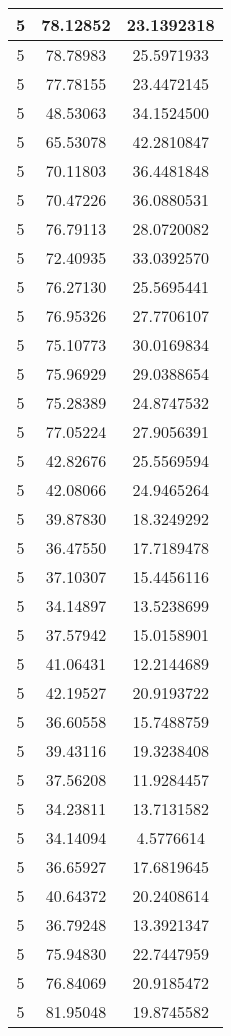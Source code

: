 \documentclass[
]{book}
\begin{document}
\begin{tabular}{c|c|c}
\hline
5 & 78.12852 & 23.1392318\\
\hline
5 & 78.78983 & 25.5971933\\
\hline
5 & 77.78155 & 23.4472145\\
\hline
5 & 48.53063 & 34.1524500\\
\hline
5 & 65.53078 & 42.2810847\\
\hline
5 & 70.11803 & 36.4481848\\
\hline
5 & 70.47226 & 36.0880531\\
\hline
5 & 76.79113 & 28.0720082\\
\hline
5 & 72.40935 & 33.0392570\\
\hline
5 & 76.27130 & 25.5695441\\
\hline
5 & 76.95326 & 27.7706107\\
\hline
5 & 75.10773 & 30.0169834\\
\hline
5 & 75.96929 & 29.0388654\\
\hline
5 & 75.28389 & 24.8747532\\
\hline
5 & 77.05224 & 27.9056391\\
\hline
5 & 42.82676 & 25.5569594\\
\hline
5 & 42.08066 & 24.9465264\\
\hline
5 & 39.87830 & 18.3249292\\
\hline
5 & 36.47550 & 17.7189478\\
\hline
5 & 37.10307 & 15.4456116\\
\hline
5 & 34.14897 & 13.5238699\\
\hline
5 & 37.57942 & 15.0158901\\
\hline
5 & 41.06431 & 12.2144689\\
\hline
5 & 42.19527 & 20.9193722\\
\hline
5 & 36.60558 & 15.7488759\\
\hline
5 & 39.43116 & 19.3238408\\
\hline
5 & 37.56208 & 11.9284457\\
\hline
5 & 34.23811 & 13.7131582\\
\hline
5 & 34.14094 & 4.5776614\\
\hline
5 & 36.65927 & 17.6819645\\
\hline
5 & 40.64372 & 20.2408614\\
\hline
5 & 36.79248 & 13.3921347\\
\hline
5 & 75.94830 & 22.7447959\\
\hline
5 & 76.84069 & 20.9185472\\
\hline
5 & 81.95048 & 19.8745582\\

\end{tabular}
\end{document}
